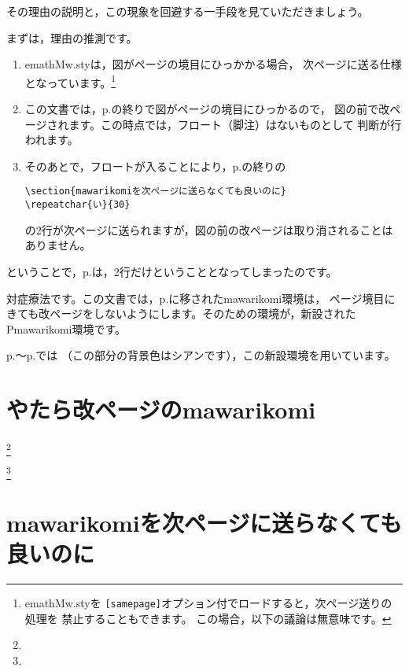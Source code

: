 \documentclass[fleqn,a4j]{jarticle}
\begin{document}
その理由の説明と，この現象を回避する一手段を見ていただきましょう。

まずは，理由の推測です。

\begin{enumerate}[1)]
  \item \textsf{emathMw.sty}は，図がページの境目にひっかかる場合，
    次ページに送る仕様となっています。\footnote{\textsf{emathMw.sty}を
    \texttt{[samepage]}オプション付でロードすると，次ページ送りの処理を
    禁止することもできます。
    この場合，以下の議論は無意味です。}
  \item この文書では，p.\pageref{okuruna}の終りで図がページの境目にひっかるので，
    図の前で改ページされます。この時点では，フロート（脚注）はないものとして
    判断が行われます。
  \item そのあとで，フロートが入ることにより，p.\pageref{okuruna}の終りの
    \begin{jquote}
    \begin{verbatim}
\section{mawarikomiを次ページに送らなくても良いのに}
\repeatchar{い}{30}
    \end{verbatim}
    \end{jquote}
    の2行が次ページに送られますが，図の前の改ページは取り消されることはありません。
\end{enumerate}
ということで，p.\pageref{okuruna}は，2行だけということとなってしまったのです。

対症療法です。この文書では，p.\pageref{tuduki}に移された\textsf{mawarikomi}環境は，
ページ境目にきても改ページをしないようにします。そのための環境が，新設された
\textsf{Pmawarikomi}環境です。

p.\pageref{kaiteis}〜p.\pageref{kaiteie}では
（この部分の背景色はシアンです），この新設環境を用いています。

\clearpage

\pagecolor{yellow}
\section*{やたら改ページのmawarikomi}\label{yatara}
\footnote{}

\footnote{}

\section*{mawarikomiを次ページに送らなくても良いのに}\label{okuruna}
\pagecolor{yellow}
\end{document}

